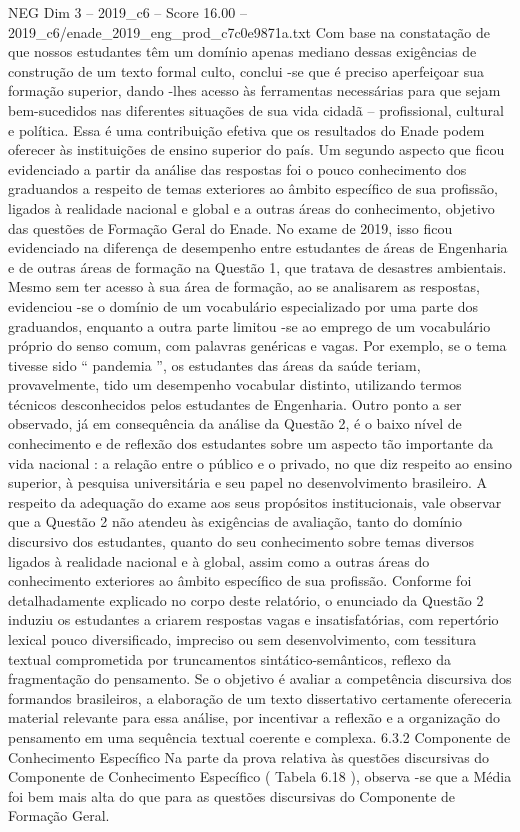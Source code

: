 \begin{textsample}{NEG Dim 3 – 2019\_c6 – Score 16.00 – 2019\_c6/enade\_2019\_eng\_prod\_c7c0e9871a.txt}
Com base na constatação de que nossos estudantes têm um domínio apenas mediano dessas exigências de construção de um texto formal culto, conclui -se que é preciso aperfeiçoar sua formação superior, dando -lhes acesso às ferramentas necessárias para que sejam bem-sucedidos nas diferentes situações de sua vida cidadã – profissional, cultural e política.
Essa é uma contribuição efetiva que os resultados do Enade podem oferecer às instituições de ensino superior do país.
Um segundo aspecto que ficou evidenciado a partir da análise das respostas foi o pouco conhecimento dos graduandos a respeito de temas exteriores ao âmbito específico de sua profissão, ligados à realidade nacional e global e a outras áreas do conhecimento, objetivo das questões de Formação Geral do Enade.
No exame de 2019, isso ficou evidenciado na diferença de desempenho entre estudantes de áreas de Engenharia e de outras áreas de formação na Questão 1, que tratava de desastres ambientais.
Mesmo sem ter acesso à sua área de formação, ao se analisarem as respostas, evidenciou -se o domínio de um vocabulário especializado por uma parte dos graduandos, enquanto a outra parte limitou -se ao emprego de um vocabulário próprio do senso comum, com palavras genéricas e vagas.
Por exemplo, se o tema tivesse sido “ pandemia ”, os estudantes das áreas da saúde teriam, provavelmente, tido um desempenho vocabular distinto, utilizando termos técnicos desconhecidos pelos estudantes de Engenharia.
Outro ponto a ser observado, já em consequência da análise da Questão 2, é o baixo nível de conhecimento e de reflexão dos estudantes sobre um aspecto tão importante da vida nacional : a relação entre o público e o privado, no que diz respeito ao ensino superior, à pesquisa universitária e seu papel no desenvolvimento brasileiro.
A respeito da adequação do exame aos seus propósitos institucionais, vale observar que a Questão 2 não atendeu às exigências de avaliação, tanto do domínio discursivo dos estudantes, quanto do seu conhecimento sobre temas diversos ligados à realidade nacional e à global, assim como a outras áreas do conhecimento exteriores ao âmbito específico de sua profissão.
Conforme foi detalhadamente explicado no corpo deste relatório, o enunciado da Questão 2 induziu os estudantes a criarem respostas vagas e insatisfatórias, com repertório lexical pouco diversificado, impreciso ou sem desenvolvimento, com tessitura textual comprometida por truncamentos sintático-semânticos, reflexo da fragmentação do pensamento.
Se o objetivo é avaliar a competência discursiva dos formandos brasileiros, a elaboração de um texto dissertativo certamente ofereceria material relevante para essa análise, por incentivar a reflexão e a organização do pensamento em uma sequência textual coerente e complexa. 6.3.2 Componente de Conhecimento Específico Na parte da prova relativa às questões discursivas do Componente de Conhecimento Específico ( Tabela 6.18 ), observa -se que a Média foi bem mais alta do que para as questões discursivas do Componente de Formação Geral.

\end{textsample}
